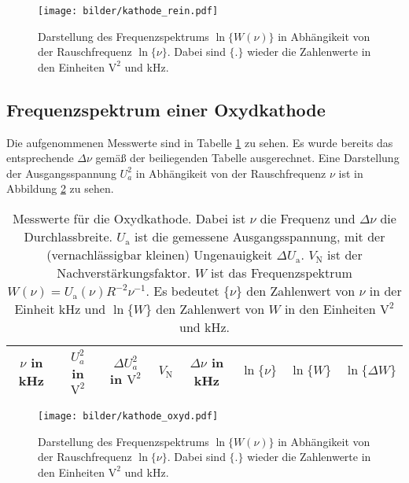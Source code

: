 	\begin{figure}
		\centering
		\texttt{[image: bilder/kathode\_rein.pdf]}
		\caption{Darstellung des Frequenzspektrums $\ln\{W(\nu)\}$ in
		Abhängikeit von der Rauschfrequenz $\ln\{\nu\}$. Dabei sind $\{ . \}$ wieder 
		die Zahlenwerte in den Einheiten $\text{V}^2$ und kHz.}
		\label{fig:kathode_rein}
	\end{figure}

\clearpage
\subsection{Frequenzspektrum einer Oxydkathode}

	Die aufgenommenen Messwerte sind in Tabelle
	\ref{tab:kathode_oxyd} zu sehen. Es wurde bereits das
	entsprechende $\Delta \nu$ gemäß der beiliegenden Tabelle
	ausgerechnet. Eine Darstellung der Ausgangsspannung $U_a^2$ in
	Abhängikeit von der Rauschfrequenz $\nu$ ist in Abbildung
	\ref{fig:kathode_oxyd} zu sehen.
	\begin{table}
		\centering
		\begin{tabular}{cccccccc}
		\toprule \midrule
		$\nu$ in kHz	 & $U_a^2$ in $\text{V}^2$	& $\Delta U_a^2$ in $\text{V}^2$ & 
		$V_\text{N}$	 & $\Delta \nu$ in kHz 		& $\ln \{\nu\}$				     &	
		$\ln \{W\}$	 & $\ln \{\Delta W\} $ \\
		\midrule
		
		\midrule
		\bottomrule
		\end{tabular}
		\caption{Messwerte für
		die Oxydkathode. Dabei ist $\nu$ die Frequenz und $\Delta \nu$ die 
		Durchlassbreite. $U_\text{a}$ ist die gemessene Ausgangsspannung, mit der 
		(vernachlässigbar kleinen) Ungenauigkeit $\Delta U_\text{a}$. $V_\text{N}$ 
		ist der Nachverstärkungsfaktor. $W$ ist das Frequenzspektrum 
		$W(\nu)=U_\text{a}(\nu) R^{-2} \nu^{-1}$. Es bedeutet $\{\nu \}$ den 
		Zahlenwert von $\nu$ in der Einheit kHz und $\ln\{W\}$ den Zahlenwert 
		von $W$ in den Einheiten $\text{V}^2$ und kHz.}
		\label{tab:kathode_oxyd}
	\end{table}

	\begin{figure}
		\centering
		\texttt{[image: bilder/kathode\_oxyd.pdf]}
		\caption{Darstellung des Frequenzspektrums $\ln\{W(\nu)\}$ in
		Abhängikeit von der Rauschfrequenz $\ln\{\nu\}$. Dabei sind $\{ . \}$ wieder 
		die Zahlenwerte in den Einheiten $\text{V}^2$ und kHz.}
		\label{fig:kathode_oxyd}
	\end{figure}

